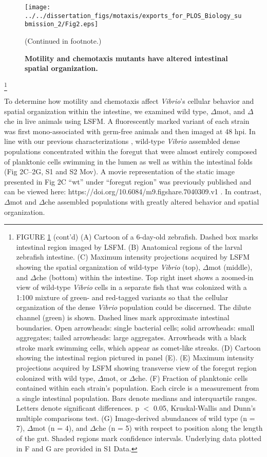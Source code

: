 {\begin{figure}%
	\centerline{
		\texttt{[image: ../../dissertation\_figs/motaxis/exports\_for\_PLOS\_Biology\_submission\_2/Fig2.eps]}}
	\caption{\textbf{Motility and chemotaxis mutants have altered intestinal spatial organization.}}{(Continued in footnote.)}
	\label{fig:motaxis_fig2}
\end{figure}

{\let\thefootnote\relax\footnote{FIGURE \ref{fig:motaxis_fig2} (cont'd) (A) Cartoon of a 6-day-old zebrafish. Dashed box marks intestinal region imaged by LSFM. (B) Anatomical regions of the larval zebrafish intestine. (C) Maximum intensity projections acquired by LSFM showing the spatial organization of wild-type \textit{Vibrio} (top), $\Delta$mot (middle), and $\Delta$che (bottom) within the intestine. Top right inset shows a zoomed-in view of wild-type \textit{Vibrio} cells in a separate fish that was colonized with a 1:100 mixture of green- and red-tagged variants so that the cellular organization of the dense \textit{Vibrio} population could be discerned. The dilute channel (green) is shown. Dashed lines mark approximate intestinal boundaries. Open arrowheads: single bacterial cells; solid arrowheads: small aggregates; tailed arrowheads: large aggregates. Arrowheads with a black stroke mark swimming cells, which appear as comet-like streaks. (D) Cartoon showing the intestinal region pictured in panel (E). (E) Maximum intensity projections acquired by LSFM showing transverse view of the foregut region colonized with wild type, $\Delta$mot, or $\Delta$che. (F) Fraction of planktonic cells contained within each strain's population. Each circle is a measurement from a single intestinal population. Bars denote medians and interquartile ranges. Letters denote significant differences. p $ < $ 0.05, Kruskal-Wallis and Dunn's multiple comparisons test. (G) Image-derived abundances of wild type (n = 7), $\Delta$mot (n = 4), and $\Delta$che (n = 5) with respect to position along the length of the gut. Shaded regions mark confidence intervals. Underlying data plotted in F and G are provided in S1 Data.}


To determine how motility and chemotaxis affect \textit{Vibrio}'s cellular behavior and spatial organization within the intestine, we examined wild type, $\Delta$mot, and $\Delta$che in live animals using LSFM. A fluorescently marked variant of each strain was first mono-associated with germ-free animals and then imaged at 48 hpi. In line with our previous characterizations \cite{wiles_modernized_2018,schlomann_bacterial_2018}, wild-type \textit{Vibrio} assembled dense populations concentrated within the foregut that were almost entirely composed of planktonic cells swimming in the lumen as well as within the intestinal folds (Fig 2C–2G, S1 and S2 Mov). A movie representation of the static image presented in Fig 2C ``wt'' under ``foregut region'' was previously published and can be viewed here: https://doi.org/10.6084/m9.figshare.7040309.v1 \cite{wiles_modernized_2018}. In contrast, $\Delta$mot and $\Delta$che assembled populations with greatly altered behavior and spatial organization. 

}}
